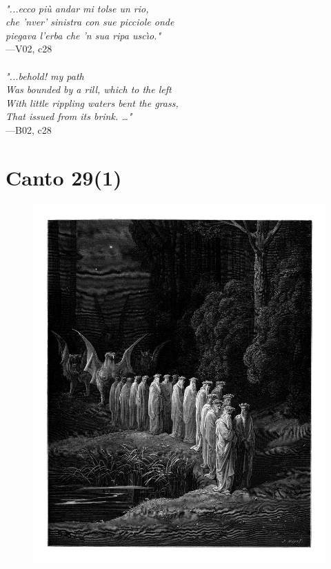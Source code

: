 \documentclass[../Dore_vision.tex]{subfiles}
\begin{document}
\begin{center}
\begin{minipage}{0.8\linewidth}
\textit{\\
"...ecco più andar mi tolse un rio,\\che ’nver’ sinistra con sue picciole onde\\piegava l’erba che ’n sua ripa usc\`{\i}o."} \\
—V02, c28 \\~\\
\textit{"...behold! my path\\Was bounded by a rill, which to the left\\With little rippling waters bent the grass,\\That issued from its brink. …"} \\
—B02, c28
\end{minipage}
\end{center}

\newpage

\section{Canto 29(1)}

\begin{figure}[ht]
\centering
\includegraphics[height=\figsize]{illustrations/book_2/V02, c29(1).jpg}
\end{figure}
\end{document}
